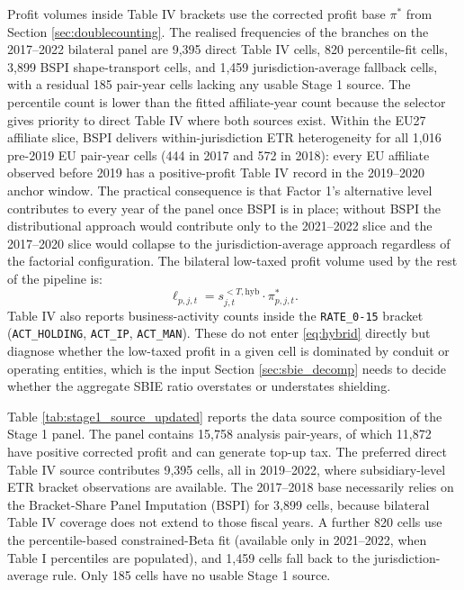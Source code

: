 \documentclass[11pt,a4paper]{article}
\newcommand{\code}[1]{\texttt{#1}}
\begin{document}
Profit volumes inside Table IV brackets use the corrected profit base $\pi^{*}$ from Section \ref{sec:doublecounting}. The realised frequencies of the branches on the 2017--2022 bilateral panel are 9{,}395 direct Table IV cells, 820 percentile-fit cells, 3{,}899 BSPI shape-transport cells, and 1{,}459 jurisdiction-average fallback cells, with a residual 185 pair-year cells lacking any usable Stage 1 source. The percentile count is lower than the fitted affiliate-year count because the selector gives priority to direct Table IV where both sources exist. Within the EU27 affiliate slice, BSPI delivers within-jurisdiction ETR heterogeneity for all 1{,}016 pre-2019 EU pair-year cells (444 in 2017 and 572 in 2018): every EU affiliate observed before 2019 has a positive-profit Table IV record in the 2019--2020 anchor window. The practical consequence is that Factor 1's alternative level contributes to every year of the panel once BSPI is in place; without BSPI the distributional approach would contribute only to the 2021--2022 slice and the 2017--2020 slice would collapse to the jurisdiction-average approach regardless of the factorial configuration. The bilateral low-taxed profit volume used by the rest of the pipeline is:
\begin{equation}\label{eq:lowtax_profit}
\ell_{p,j,t} = s_{j,t}^{<T,\text{hyb}} \cdot \pi_{p,j,t}^{*}.
\end{equation}
Table IV also reports business-activity counts inside the \code{RATE\_0-15} bracket (\code{ACT\_HOLDING}, \code{ACT\_IP}, \code{ACT\_MAN}). These do not enter \eqref{eq:hybrid} directly but diagnose whether the low-taxed profit in a given cell is dominated by conduit or operating entities, which is the input Section \ref{sec:sbie_decomp} needs to decide whether the aggregate SBIE ratio overstates or understates shielding.



Table \ref{tab:stage1_source_updated} reports the data source composition of the Stage 1 panel. The panel contains 15{,}758 analysis pair-years, of which 11{,}872 have positive corrected profit and can generate top-up tax. The preferred direct Table IV source contributes 9{,}395 cells, all in 2019--2022, where subsidiary-level ETR bracket observations are available. The 2017--2018 base necessarily relies on the Bracket-Share Panel Imputation (BSPI) for 3{,}899 cells, because bilateral Table IV coverage does not extend to those fiscal years. A further 820 cells use the percentile-based constrained-Beta fit (available only in 2021--2022, when Table I percentiles are populated), and 1{,}459 cells fall back to the jurisdiction-average rule. Only 185 cells have no usable Stage 1 source.
\end{document}
